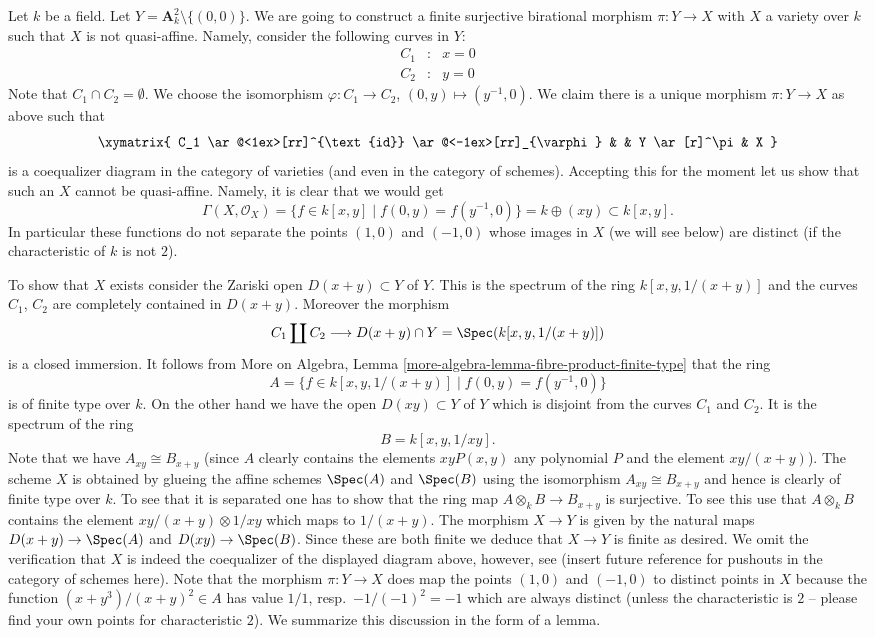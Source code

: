 \medskip\noindent
Let $k$ be a field.
Let $Y = \mathbf{A}^2_k \setminus \{(0, 0)\}$.
We are going to construct a finite surjective birational morphism
$\pi : Y \longrightarrow X$
with $X$ a variety over $k$ such that $X$ is not quasi-affine.
Namely, consider the following curves in $Y$:
$$
\begin{matrix}
C_1 & : & x = 0 \\
C_2 & : & y = 0
\end{matrix}
$$
Note that $C_1 \cap C_2 = \emptyset$. We choose the isomorphism
$\varphi : C_1 \to C_2$, $(0, y) \mapsto (y^{-1}, 0)$.
We claim there is a unique morphism $\pi : Y \to X$ as above
such that
$$
\xymatrix{
C_1
\ar@<1ex>[rr]^{\text{id}} \ar@<-1ex>[rr]_{\varphi}
& &
Y \ar[r]^\pi & X
}
$$
is a coequalizer diagram in the category of varieties (and even in
the category of schemes). Accepting this for the moment let us
show that such an $X$ cannot be quasi-affine. Namely, it is clear
that we would get
$$
\Gamma(X, \mathcal{O}_X) =
\{ f \in k[x, y] \mid f(0, y) = f(y^{-1}, 0)\} =
k \oplus (xy) \subset k[x, y].
$$
In particular these functions do not separate the points $(1, 0)$
and $(-1, 0)$ whose images in $X$ (we will see below) are distinct
(if the characteristic of $k$ is not $2$).

\medskip\noindent
To show that $X$ exists consider the Zariski open
$D(x + y) \subset Y$ of $Y$. This is the spectrum
of the ring
$k[x, y, 1/(x + y)]$
and the curves $C_1$, $C_2$ are completely contained in
$D(x + y)$. Moreover the morphism
$$
C_1 \coprod C_2
\longrightarrow
D(x + y) \cap Y = \Spec(k[x, y, 1/(x + y)])
$$
is a closed immersion. It follows from
More on Algebra, Lemma \ref{more-algebra-lemma-fibre-product-finite-type}
that the ring
$$
A =
\{f \in k[x, y, 1/(x + y)] \mid f(0, y) = f(y^{-1}, 0)\}
$$
is of finite type over $k$. On the other hand we have the open
$D(xy) \subset Y$ of $Y$ which is disjoint from the curves $C_1$
and $C_2$. It is the spectrum of the ring
$$
B = k[x, y, 1/xy].
$$
Note that we have $A_{xy} \cong B_{x + y}$ (since $A$ clearly contains
the elements $xyP(x, y)$ any polynomial $P$ and the element $xy/(x + y)$).
The scheme $X$ is obtained by glueing the affine schemes
$\Spec(A)$ and $\Spec(B)$ using the isomorphism
$A_{xy} \cong B_{x + y}$ and hence is clearly of finite type over
$k$. To see that it is separated one has to show that the
ring map $A \otimes_k B \to B_{x + y}$ is surjective. To see
this use that $A \otimes_k B$ contains the element
$xy/(x + y) \otimes 1/xy$ which maps to $1/(x + y)$.
The morphism $X \to Y$ is given by the natural maps
$D(x + y) \to \Spec(A)$ and $D(xy) \to \Spec(B)$.
Since these are both finite we deduce that $X \to Y$ is finite
as desired. We omit the verification that $X$ is indeed the
coequalizer of the displayed diagram above, however, see
(insert future reference for pushouts in the category of schemes
here). Note that the morphism $\pi : Y \to X$ does
map the points  $(1, 0)$
and $(-1, 0)$ to distinct points in $X$ because the
function $(x + y^3)/(x + y)^2 \in A$ has value
$1/1$, resp.\ $-1/(-1)^2 = -1$ which are always distinct
(unless the characteristic is $2$ -- please find your own points
for characteristic $2$). We summarize this discussion in the
form of a lemma.

